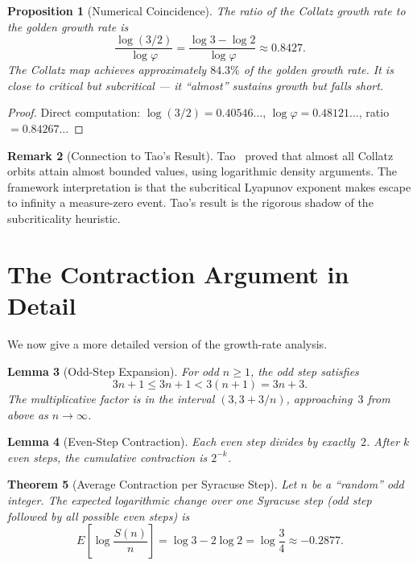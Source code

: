 \documentclass[11pt,a4paper]{article}
\newtheorem{theorem}{Theorem}[section]
\newtheorem{lemma}[theorem]{Lemma}
\newtheorem{proposition}[theorem]{Proposition}
\theoremstyle{definition}
\newtheorem{remark}[theorem]{Remark}
\begin{document}
\begin{proposition}[Numerical Coincidence]\label{prop:ratio}
The ratio of the Collatz growth rate to the golden growth rate is
\begin{equation}
  \frac{\log(3/2)}{\log\varphi} = \frac{\log 3 - \log 2}{\log\varphi}
  \approx 0.8427.
\end{equation}
The Collatz map achieves approximately $84.3\%$ of the golden growth rate.
It is close to critical but subcritical --- it ``almost'' sustains growth
but falls short.
\end{proposition}

\begin{proof}
Direct computation: $\log(3/2) = 0.40546\ldots$,
$\log\varphi = 0.48121\ldots$, ratio $= 0.84267\ldots$
\end{proof}

\begin{remark}[Connection to Tao's Result]
Tao~\cite{tao} proved that almost all Collatz orbits attain almost bounded
values, using logarithmic density arguments. The framework interpretation
is that the subcritical Lyapunov exponent makes escape to infinity a
measure-zero event. Tao's result is the rigorous shadow of the
subcriticality heuristic.
\end{remark}

\section{The Contraction Argument in Detail}\label{sec:contraction}

We now give a more detailed version of the growth-rate analysis.

\begin{lemma}[Odd-Step Expansion]\label{lem:odd}
For odd $n \geq 1$, the odd step satisfies
\[
  3n + 1 \leq 3n + 1 < 3(n + 1) = 3n + 3.
\]
The multiplicative factor is in the interval $(3, 3 + 3/n)$, approaching~$3$
from above as $n \to \infty$.
\end{lemma}

\begin{lemma}[Even-Step Contraction]\label{lem:even}
Each even step divides by exactly~$2$. After $k$ even steps, the cumulative
contraction is $2^{-k}$.
\end{lemma}

\begin{theorem}[Average Contraction per Syracuse Step]\label{thm:contraction}
Let $n$ be a ``random'' odd integer. The expected logarithmic change over one
Syracuse step (odd step followed by all possible even steps) is
\begin{equation}
  E\!\left[\log\frac{S(n)}{n}\right] = \log 3 - 2\log 2 = \log\frac{3}{4}
  \approx -0.2877.
\end{equation}
\end{theorem}
\end{document}
